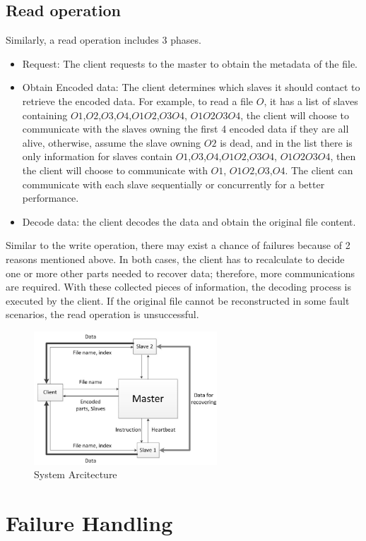 \documentclass[conference]{IEEEtran}
\begin{document}
\subsection{Read operation}
Similarly, a read operation includes 3 phases.
\begin{itemize}
\item Request: The client requests to the master to obtain the metadata of the file.
\item Obtain Encoded data:  The client determines which slaves it should contact to retrieve the encoded data. For example, to read a file $O$, it has a list of slaves containing $O1$,$O2$,$O3$,$O4$,$O1O2$,$O3O4$, $O1O2O3O4$, the client will choose to communicate with the slaves owning the first 4 encoded data if they are all alive, otherwise, assume the slave owning $O2$ is dead, and in the list there is only information for slaves contain $O1$,$O3$,$O4$,$O1O2$,$O3O4$, $O1O2O3O4$, then the client will choose to communicate with $O1$, $O1O2$,$O3$,$O4$. The client can communicate with each slave sequentially or concurrently for a better performance. 
\item Decode data: the client decodes the data and obtain the  original file content.
\end{itemize}
Similar to the write operation, there may exist a chance of failures because of 2  reasons mentioned above. In both cases, the client has to recalculate to decide one or more other parts needed to recover data; therefore, more communications are required. With these collected pieces of information, the decoding process is executed by the client. If the original file cannot be reconstructed in some fault scenarios, the read operation is unsuccessful. 

\begin{figure}
	\centering
		\includegraphics[height=50mm]{a.jpg}
		\caption{System Arcitecture}
	\label{fig:a}
\end{figure}


\section{Failure Handling}
\end{document}
